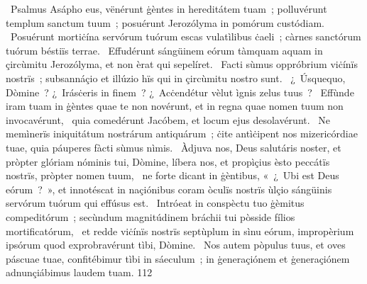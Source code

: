 {~Psalmus Asápho}
{%
eus, vënérunt ġèntes in hereditátem tuam~; polluvérunt templum sanctum tuum~; posuérunt Jerozólyma in pomórum custódiam. 
~Posuérunt mortiċína servórum tuórum escas vulatìlibus ċaeli~; càrnes sanctórum tuórum béstiïs terrae. 
~Effudérunt sángüinem eórum tàmquam aquam in çircùmitu Jerozólyma, et non èrat qui sepelíret. 
~Facti sùmus oppróbrium viċínïs nostrïs~; subsannáçio et illúzio hïs qui in çircùmitu nostro sunt. 
~¿~Úsquequo, Dòmine~? ¿~Irásċeris in finem~? ¿~Acċendétur vèlut ìgnis zelus tuus~? 
~Effùnde iram tuam in ġèntes quae te non novérunt, et in regna quae nomen tuum non invocavérunt, 
~quia comedérunt Jacóbem, et locum ejus desolavérunt. 
~Ne memìnerïs iniquitátum nostrárum antiquárum~; ċite antìċipent nos mizericórdiae tuae, quia páuperes fàcti sùmus nìmis. 
~Àdjuva nos, Deus salutáris noster, et pròpter glóriam nóminis tui, Dòmine, líbera nos, et propìçius èsto peccátïs nostrïs, pròpter nomen tuum, 
~ne forte dicant in ġèntibus, «~¿~Ubi est Deus eórum~?~», et innotéscat in naçiónibus coram òculïs nostrïs ùlçio sángüinis servórum tuórum qui effúsus est. 
~Intróeat in conspèctu tuo ġèmitus compeditórum~; secùndum magnitúdinem bráchii tui pòsside fílios mortificatórum, 
~et redde viċínïs nostrïs septùplum in sìnu eórum, impropèrium ipsórum quod exprobravérunt tìbi, Dòmine. 
~Nos autem pòpulus tuus, et oves páscuae tuae, confitébimur tìbi in sáeculum~; in ġeneraçiónem et ġeneraçiónem adnunçiábimus laudem tuam. 
}
{11}{2}
